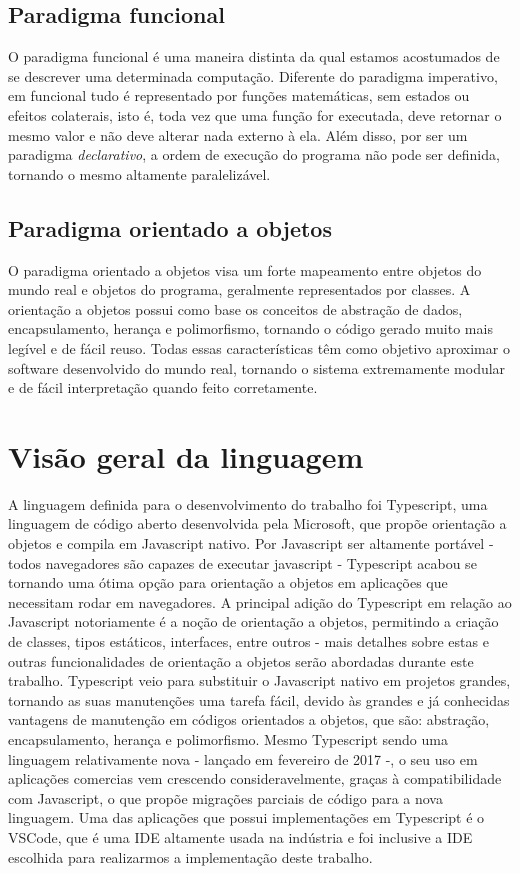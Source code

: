 \documentclass[rel_mlp]{iiufrgs}
\numberwithin{figure}{chapter}
\begin{document}
\section{Paradigma funcional}

O paradigma funcional é uma maneira distinta da qual estamos acostumados de se descrever uma determinada computação. Diferente do paradigma imperativo, em funcional tudo é representado por funções matemáticas, sem estados ou efeitos colaterais, isto é, toda vez que uma função for executada, deve retornar o mesmo valor e não deve alterar nada externo à ela. Além disso, por ser um paradigma \textit{declarativo}, a ordem de execução do programa não pode ser definida, tornando o mesmo altamente paralelizável.

\section{Paradigma orientado a objetos}

O paradigma orientado a objetos visa um forte mapeamento entre objetos do mundo real e objetos do programa, geralmente representados por classes. A orientação a objetos possui como base os conceitos de abstração de dados, encapsulamento, herança e polimorfismo, tornando o código gerado muito mais legível e de fácil reuso. Todas essas características têm como objetivo aproximar o software desenvolvido do mundo real, tornando o sistema extremamente modular e de fácil interpretação quando feito corretamente.


\chapter{Visão geral da linguagem}

A linguagem definida para o desenvolvimento do trabalho foi Typescript, uma linguagem de código aberto desenvolvida pela Microsoft, que propõe orientação a objetos e compila em Javascript nativo. Por Javascript ser altamente portável - todos navegadores são capazes de executar javascript - Typescript acabou se tornando uma ótima opção para orientação a objetos em aplicações que necessitam rodar em navegadores. A principal adição do Typescript em relação ao Javascript notoriamente é a noção de orientação a objetos, permitindo a criação de classes, tipos estáticos, interfaces, entre outros - mais detalhes sobre estas e outras funcionalidades de orientação a objetos serão abordadas durante este trabalho. Typescript veio para substituir o Javascript nativo em projetos grandes, tornando as suas manutenções uma tarefa fácil, devido às grandes e já conhecidas vantagens de manutenção em códigos orientados a objetos, que são: abstração, encapsulamento, herança e polimorfismo. Mesmo Typescript sendo uma linguagem relativamente nova - lançado em fevereiro de 2017 -, o seu uso em aplicações comercias vem crescendo consideravelmente, graças à compatibilidade com Javascript, o que propõe migrações parciais de código para a nova linguagem. Uma das aplicações que possui implementações em Typescript é o VSCode, que é uma IDE altamente usada na indústria e foi inclusive a IDE escolhida para realizarmos a implementação deste trabalho.
\end{document}
